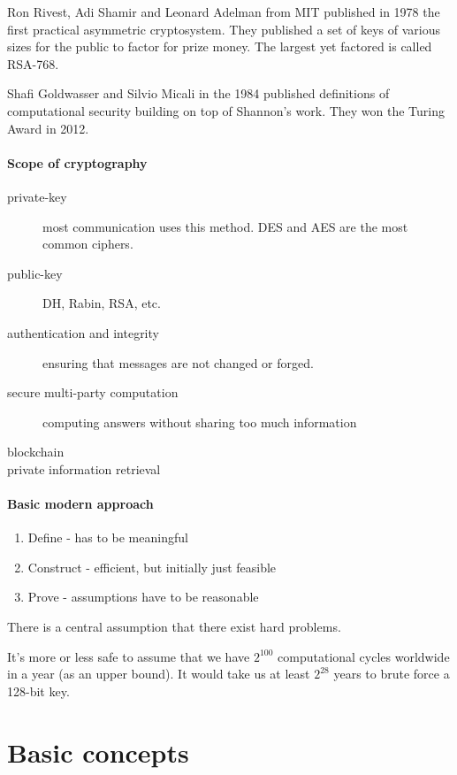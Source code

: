 \documentclass{idc_msc}
\begin{document}
Ron Rivest, Adi Shamir and Leonard Adelman from MIT published in 1978\cite{Rivest:1978:MOD:359340.359342} the first practical asymmetric cryptosystem.
They published a set of keys of various sizes for the public to factor for prize money.
The largest yet factored is called RSA-768.

Shafi Goldwasser and Silvio Micali in the 1984\cite{goldwasser1984probabilistic} published definitions of computational security building on top of Shannon's work.
They won the Turing Award in 2012.

\paragraph{Scope of cryptography}

\begin{description}
  \item[private-key] most communication uses this method. DES and AES are the most common ciphers.
  \item[public-key] DH, Rabin, RSA, etc.
  \item[authentication and integrity] ensuring that messages are not changed or forged.
  \item[secure multi-party computation] computing answers without sharing too much information
  \item[blockchain]
  \item[private information retrieval]
\end{description}

\paragraph{Basic modern approach}

\begin{enumerate}
  \item Define - has to be meaningful
  \item Construct - efficient, but initially just feasible
  \item Prove - assumptions have to be reasonable
\end{enumerate}

There is a central assumption that there exist hard problems.

It's more or less safe to assume that we have \(2^{100}\) computational cycles worldwide in a year (as an upper bound).
It would take us at least \(2^{28}\) years to brute force a 128-bit key.

\section{Basic concepts}
\end{document}
